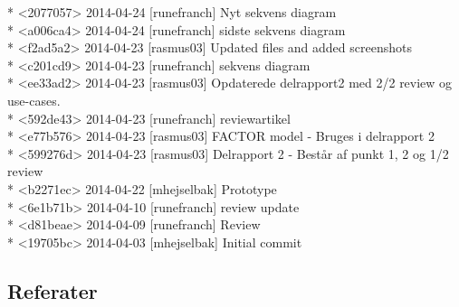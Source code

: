 \documentclass[12pt]{article}
\begin{document}
* <2077057> 2014-04-24 [runefranch]  Nyt sekvens diagram \\
* <a006ca4> 2014-04-24 [runefranch]  sidste sekvens diagram \\ 
* <f2ad5a2> 2014-04-23 [rasmus03]  Updated files and added screenshots \\
* <c201cd9> 2014-04-23 [runefranch]  sekvens diagram \\
* <ee33ad2> 2014-04-23 [rasmus03]  Opdaterede delrapport2 med 2/2 review og use-cases. \\
* <592de43> 2014-04-23 [runefranch]  reviewartikel \\
* <e77b576> 2014-04-23 [rasmus03]  FACTOR model - Bruges i delrapport 2 \\
* <599276d> 2014-04-23 [rasmus03]  Delrapport 2 - Består af punkt 1, 2 og 1/2 review \\
* <b2271ec> 2014-04-22 [mhejselbak]  Prototype \\
* <6e1b71b> 2014-04-10 [runefranch]  review update \\
* <d81beae> 2014-04-09 [runefranch]  Review \\
* <19705bc> 2014-04-03 [mhejselbak]  Initial commit \\
\subsection{Referater}
\end{document}
